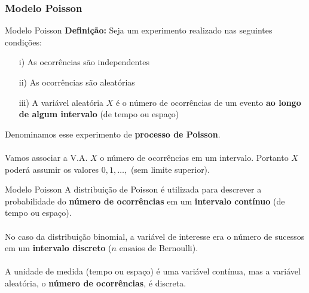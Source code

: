 \documentclass[10pt]{beamer}\usepackage[]{graphicx}\usepackage[]{color}
\theoremstyle{definition}
\begin{document}


\subsubsection{Modelo Poisson}

\begin{frame}[fragile]{Modelo Poisson}
  \textbf{Definição:} Seja um experimento realizado nas seguintes
  condições:
  \begin{itemize}
  \item[i)] As ocorrências são independentes
  \item[ii)] As ocorrências são aleatórias
  \item[iii)] A variável aleatória $X$ é o número de ocorrências de um
    evento \textbf{ao longo de algum intervalo} (de tempo ou espaço)
  \end{itemize}
  \vspace{1em}
  Denominamos esse experimento de \textbf{processo de Poisson}. \\~\\
  Vamos associar a V.A. $X$ o número de ocorrências em um
  intervalo. Portanto $X$ poderá assumir os valores $0, 1, \ldots,$ (sem
  limite superior).
\end{frame}

\begin{frame}[fragile]{Modelo Poisson}
  A distribuição de Poisson é utilizada para descrever
  a probabilidade do \textbf{número de ocorrências} em um \textbf{intervalo
  contínuo} (de tempo ou espaço). \\~\\
  No caso da distribuição binomial, a variável de interesse era o número
  de sucessos em um \textbf{intervalo discreto} ($n$ ensaios de
  Bernoulli). \\~\\
  A unidade de medida (tempo ou espaço) é uma variável contínua, mas a
  \textsf{variável aleatória}, o \textbf{número de ocorrências}, é
  discreta.
\end{frame}
\end{document}
